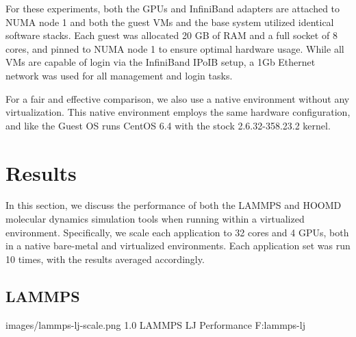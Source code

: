 For these experiments, both the GPUs and InfiniBand adapters are attached to NUMA node 1 and both the guest VMs and the base system utilized identical software stacks.  Each guest was allocated 20 GB of RAM and a full socket of 8 cores, and pinned to NUMA node 1 to ensure optimal hardware usage. While all VMs are capable of login via the InfiniBand IPoIB setup, a 1Gb Ethernet network was used for all management and login tasks.  


For a fair and effective comparison, we also use a native environment without any virtualization. This native environment employs the same hardware configuration, and like the Guest OS runs CentOS 6.4 with the stock 2.6.32-358.23.2 kernel. 


 
\section{Results}

In this section, we discuss the performance of both the LAMMPS and HOOMD molecular dynamics simulation tools when running within a virtualized environment. Specifically, we scale each application to 32 cores and 4 GPUs, both in a native bare-metal and virtualized environments.  Each application set was run 10 times, with the results averaged accordingly. 

\subsection{LAMMPS}

  {images/lammps-lj-scale.png}
  {1.0}
  {LAMMPS LJ Performance}
  {F:lammps-lj}


